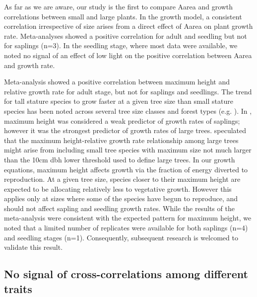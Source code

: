 \documentclass[a4paper,11pt]{article}
\begin{document}
As far as we are aware, our study is the first to compare Aarea and growth correlations between small and large plants. In the growth model, a consistent correlation irrespective of size arises from a direct effect of Aarea on plant growth rate. Meta-analyses showed a positive correlation for adult and seedling but not for saplings (n=3). In the seedling stage, where most data were available, we noted no signal of an effect of low light on the positive correlation between Aarea and growth rate.

Meta-analysis showed a positive correlation between maximum height and relative growth rate for adult stage, but not for saplings and seedlings. The trend for tall stature species to grow faster at a given tree size than small stature species has been noted across several tree size classes and forest types (e.g. \citealt{Thomas:1996do,Poorter:2008iu,Wright:2010tp,Herault:2011dd,Ruger:2012jv,Iida:2014ep}). In \citet{Wright:2010tp}, maximum height was considered a weak predictor of growth rates of saplings; however it was the strongest predictor of growth rates of large trees. \citet{Poorter:2008iu} speculated that the maximum height-relative growth rate relationship among large trees might arise from including small tree species with maximum size not much larger than the 10cm dbh lower threshold used to define large trees. In our growth equations, maximum height affects growth via the fraction of energy diverted to reproduction. At a given tree size, species closer to their maximum height are expected to be allocating relatively less to vegetative growth. However this applies only at sizes where some of the species have begun to reproduce, and should not affect sapling and seedling growth rates. While the results of the meta-analysis were consistent with the expected pattern for maximum height, we noted that a limited number of replicates were available for both saplings (n=4) and seedling stages (n=1). Consequently, subsequent research is welcomed to validate this result.

\subsection*{No signal of cross-correlations among different traits}
\end{document}
